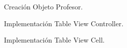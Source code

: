 	 \begin{figure}[h!]
	 	\begin{center}
	 		\caption{Creación Objeto Profesor.}
	 		\label{profesorc}
	 	\end{center}
	 \end{figure}
	 	 \begin{figure}[h!]
	 	\begin{center}
	 		\caption{Implementación Table View Controller.}
	 		\label{tableC}
	 	\end{center}
	 \end{figure}
 
	 \begin{figure}[h!]
	\begin{center}
		\caption{Implementación Table View Cell.}
		\label{tableCC}
	\end{center}
\end{figure}

